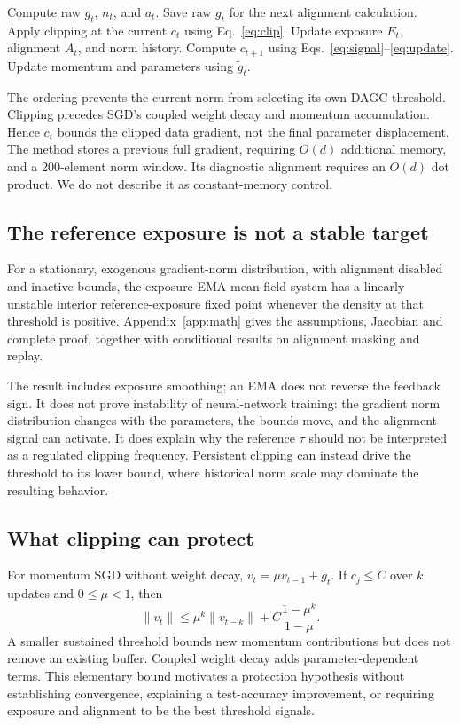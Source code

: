 \documentclass{article}
\begin{document}
\begin{algorithm}[t]
\caption{One DAGC-V2 training step}
\begin{algorithmic}[1]
\STATE Compute raw $g_t$, $n_t$, and $a_t$.
\STATE Save raw $g_t$ for the next alignment calculation.
\STATE Apply clipping at the current $c_t$ using Eq.~\eqref{eq:clip}.
\STATE Update exposure $E_t$, alignment $A_t$, and norm history.
\STATE Compute $c_{t+1}$ using Eqs.~\eqref{eq:signal}--\eqref{eq:update}.
\STATE Update momentum and parameters using $\widetilde g_t$.
\end{algorithmic}
\end{algorithm}

The ordering prevents the current norm from selecting its own DAGC threshold.
Clipping precedes SGD's coupled weight decay and momentum accumulation. Hence
$c_t$ bounds the clipped data gradient, not the final parameter displacement.
The method stores a previous full gradient, requiring $O(d)$ additional memory,
and a 200-element norm window. Its diagnostic alignment requires an $O(d)$
dot product. We do not describe it as constant-memory control.

\subsection{The reference exposure is not a stable target}
For a stationary, exogenous gradient-norm distribution, with alignment disabled
and inactive bounds, the exposure-EMA mean-field system has a linearly unstable
interior reference-exposure fixed point whenever the density at that threshold
is positive. Appendix~\ref{app:math} gives the assumptions, Jacobian and complete
proof, together with conditional results on alignment masking and replay.

The result includes exposure smoothing; an EMA does not reverse the feedback
sign. It does not prove instability of neural-network training: the gradient
norm distribution changes with the parameters, the bounds move, and the
alignment signal can activate. It does explain why the reference $\tau$
should not be interpreted as a regulated clipping frequency. Persistent
clipping can instead drive the threshold to its lower bound, where historical
norm scale may dominate the resulting behavior.

\subsection{What clipping can protect}
For momentum SGD without weight decay, $v_t=\mu v_{t-1}+\widetilde g_t$.
If $c_j\leq C$ over $k$ updates and $0\leq\mu<1$, then
\begin{equation}
 \|v_t\|\leq\mu^k\|v_{t-k}\|+
 C\frac{1-\mu^k}{1-\mu}.
\end{equation}
A smaller sustained threshold bounds new momentum contributions but does not
remove an existing buffer. Coupled weight decay adds parameter-dependent
terms. This elementary bound motivates a protection hypothesis without
establishing convergence, explaining a test-accuracy improvement, or requiring
exposure and alignment to be the best threshold signals.
\end{document}
